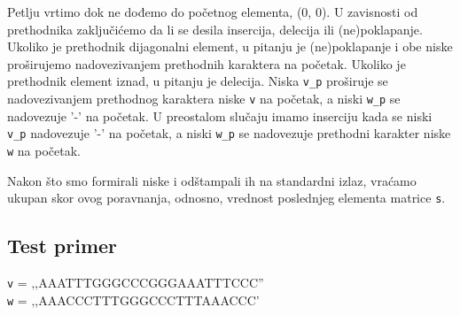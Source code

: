 Petlju vrtimo dok ne dođemo do početnog elementa, (0, 0). U zavisnosti od prethodnika zaključićemo da li se desila insercija, delecija ili (ne)poklapanje. Ukoliko je prethodnik dijagonalni element, u pitanju je (ne)poklapanje i obe niske proširujemo nadovezivanjem prethodnih karaktera na početak. Ukoliko je prethodnik element iznad, u pitanju je delecija. Niska \texttt{v\_p} proširuje se nadovezivanjem prethodnog karaktera niske \texttt{v} na početak, a niski \texttt{w\_p} se nadovezuje '-' na početak. U preostalom slučaju imamo inserciju kada se niski \texttt{v\_p} nadovezuje '-' na početak, a niski \texttt{w\_p} se nadovezuje prethodni karakter niske \texttt{w} na početak.

Nakon što smo formirali niske i odštampali ih na standardni izlaz, vraćamo ukupan skor ovog poravnanja, odnosno, vrednost poslednjeg elementa matrice \texttt{s}.




\subsection{Test primer}

\noindent\texttt{v} = ‚‚AAATTTGGGCCCGGGAAATTTCCC''
\\\texttt{w} = ‚‚AAACCCTTTGGGCCCTTTAAACCC'